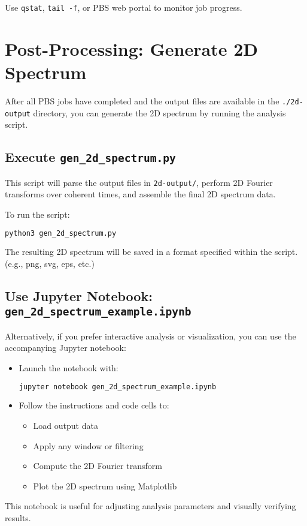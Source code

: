 \documentclass{article}
\begin{document}
Use \texttt{qstat}, \texttt{tail -f}, or PBS web portal to monitor job progress.

\section{Post-Processing: Generate 2D Spectrum}

After all PBS jobs have completed and the output files are available in the \texttt{./2d-output} directory, you can generate the 2D spectrum by running the analysis script.

\subsection*{Execute \texttt{gen\_2d\_spectrum.py}}

This script will parse the output files in \texttt{2d-output/}, perform 2D Fourier transforms over coherent times, and assemble the final 2D spectrum data.

To run the script:

\begin{lstlisting}[language=bash]
python3 gen_2d_spectrum.py
\end{lstlisting}

\noindent The resulting 2D spectrum will be saved in a format specified within the script. (e.g., png, svg, eps, etc.)

\subsection*{Use Jupyter Notebook: \texttt{gen\_2d\_spectrum\_example.ipynb}}

Alternatively, if you prefer interactive analysis or visualization, you can use the accompanying Jupyter notebook:

\begin{itemize}
    \item Launch the notebook with:
    \begin{lstlisting}[language=bash]
    jupyter notebook gen_2d_spectrum_example.ipynb
    \end{lstlisting}
    \item Follow the instructions and code cells to:
    \begin{itemize}
        \item Load output data
        \item Apply any window or filtering
        \item Compute the 2D Fourier transform
        \item Plot the 2D spectrum using Matplotlib
    \end{itemize}
\end{itemize}

This notebook is useful for adjusting analysis parameters and visually verifying results.
\end{document}
